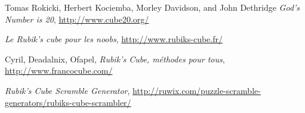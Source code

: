 \documentclass[10pt,paper=a5,pagesize]{scrbook}
\begin{document}
\begin{thebibliography}{9}
	
	 Tomas Rokicki, Herbert Kociemba, Morley Davidson, and John Dethridge
	\emph{God's Number is 20},
	\url{http://www.cube20.org/}

	\emph{Le Rubik's cube pour les noobs},
	\url{http://www.rubiks-cube.fr/}

	Cyril, Deadalnix, Ofapel,
	\emph{Rubik's Cube, méthodes pour tous},
	\url{http://www.francocube.com/}
	
	\emph{Rubik’s Cube Scramble Generator},
	\url{http://ruwix.com/puzzle-scramble-generators/rubiks-cube-scrambler/}
	
	
\end{thebibliography}
\end{document}
